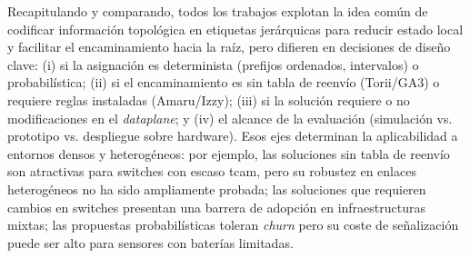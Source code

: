 Recapitulando y comparando, todos los trabajos explotan la idea común de codificar información topológica en etiquetas jerárquicas para reducir estado local y facilitar el encaminamiento hacia la raíz, pero difieren en decisiones de diseño clave: (i) si la asignación es determinista (prefijos ordenados, intervalos) o probabilística; (ii) si el encaminamiento es sin tabla de reenvío (Torii/GA3) o requiere reglas instaladas (Amaru/Izzy); (iii) si la solución requiere o no modificaciones en el \textit{dataplane}; y (iv) el alcance de la evaluación (simulación vs. prototipo vs. despliegue sobre hardware). Esos ejes determinan la aplicabilidad a entornos densos y heterogéneos: por ejemplo, las soluciones sin tabla de reenvío son atractivas para switches con escaso \gls{tcam}, pero su robustez en enlaces heterogéneos no ha sido ampliamente probada; las soluciones que requieren cambios en switches presentan una barrera de adopción en infraestructuras mixtas; las propuestas probabilísticas toleran \textit{churn} pero su coste de señalización puede ser alto para sensores con baterías limitadas.

